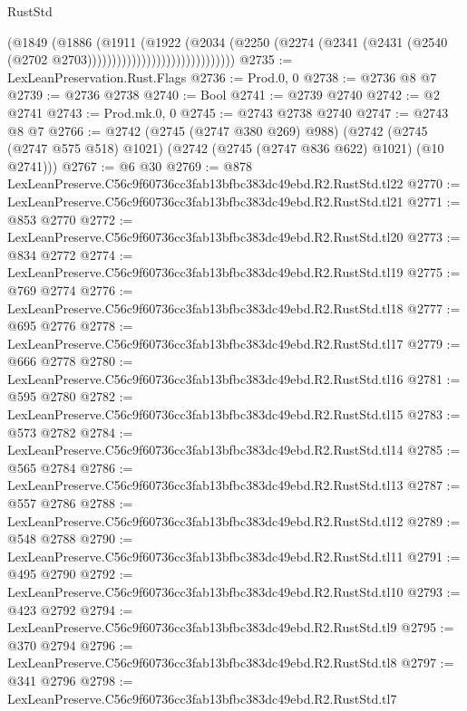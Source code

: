 \begin{lexlean}{RustStd}
\begin{coremodule}
                                          (@1849
                                            (@1886
                                              (@1911
                                                (@1922
                                                  (@2034
                                                    (@2250
                                                      (@2274
                                                        (@2341
                                                          (@2431
                                                            (@2540
                                                              (@2702
                                                                @2703))))))))))))))))))))))))))))))
@2735 := LexLeanPreservation.Rust.Flags
@2736 := Prod.{0, 0}
@2738 := @2736 @8 @7
@2739 := @2736 @2738
@2740 := Bool
@2741 := @2739 @2740
@2742 := @2 @2741
@2743 := Prod.mk.{0, 0}
@2745 := @2743 @2738 @2740
@2747 := @2743 @8 @7
@2766 := @2742
    (@2745 (@2747 @380 @269) @988)
    (@2742 (@2745 (@2747 @575 @518) @1021) (@2742 (@2745 (@2747 @836 @622) @1021) (@10 @2741)))
@2767 := @6 @30
@2769 := @878 LexLeanPreserve.C56c9f60736cc3fab13bfbc383dc49ebd.R2.RustStd.tl22
@2770 := LexLeanPreserve.C56c9f60736cc3fab13bfbc383dc49ebd.R2.RustStd.tl21
@2771 := @853 @2770
@2772 := LexLeanPreserve.C56c9f60736cc3fab13bfbc383dc49ebd.R2.RustStd.tl20
@2773 := @834 @2772
@2774 := LexLeanPreserve.C56c9f60736cc3fab13bfbc383dc49ebd.R2.RustStd.tl19
@2775 := @769 @2774
@2776 := LexLeanPreserve.C56c9f60736cc3fab13bfbc383dc49ebd.R2.RustStd.tl18
@2777 := @695 @2776
@2778 := LexLeanPreserve.C56c9f60736cc3fab13bfbc383dc49ebd.R2.RustStd.tl17
@2779 := @666 @2778
@2780 := LexLeanPreserve.C56c9f60736cc3fab13bfbc383dc49ebd.R2.RustStd.tl16
@2781 := @595 @2780
@2782 := LexLeanPreserve.C56c9f60736cc3fab13bfbc383dc49ebd.R2.RustStd.tl15
@2783 := @573 @2782
@2784 := LexLeanPreserve.C56c9f60736cc3fab13bfbc383dc49ebd.R2.RustStd.tl14
@2785 := @565 @2784
@2786 := LexLeanPreserve.C56c9f60736cc3fab13bfbc383dc49ebd.R2.RustStd.tl13
@2787 := @557 @2786
@2788 := LexLeanPreserve.C56c9f60736cc3fab13bfbc383dc49ebd.R2.RustStd.tl12
@2789 := @548 @2788
@2790 := LexLeanPreserve.C56c9f60736cc3fab13bfbc383dc49ebd.R2.RustStd.tl11
@2791 := @495 @2790
@2792 := LexLeanPreserve.C56c9f60736cc3fab13bfbc383dc49ebd.R2.RustStd.tl10
@2793 := @423 @2792
@2794 := LexLeanPreserve.C56c9f60736cc3fab13bfbc383dc49ebd.R2.RustStd.tl9
@2795 := @370 @2794
@2796 := LexLeanPreserve.C56c9f60736cc3fab13bfbc383dc49ebd.R2.RustStd.tl8
@2797 := @341 @2796
@2798 := LexLeanPreserve.C56c9f60736cc3fab13bfbc383dc49ebd.R2.RustStd.tl7

\end{coremodule}
\end{lexlean}
